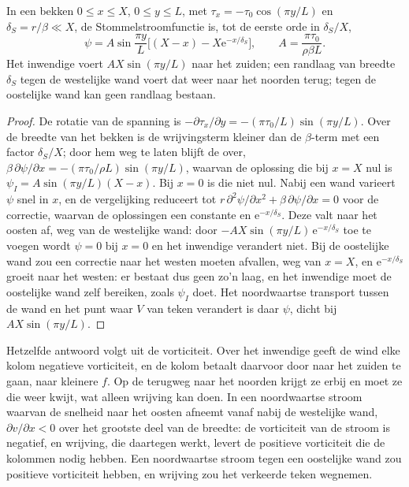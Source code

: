 \begin{theorem}\label{thm:b3:ocean-dynamics:stommel}
In een bekken $0 \le x \le X$, $0 \le y \le L$, met $\tau_x = -\tau_0
\cos(\pi y/L)$ en $\delta_S = r/\beta \ll X$, de Stommelstroomfunctie
is, tot de eerste orde in $\delta_S/X$,
\[
\psi = A\sin\frac{\pi y}{L}\Big[(X - x) - X\mathrm e^{-x/\delta_S}\Big],
\qquad A = \frac{\pi\tau_0}{\rho\beta L} .
\]
Het inwendige voert $AX\sin(\pi y/L)$ naar het zuiden; een randlaag van breedte
$\delta_S$ tegen de westelijke wand voert dat weer naar het noorden terug; tegen de oostelijke
wand kan geen randlaag bestaan.
\end{theorem}

\begin{proof}
De rotatie van de spanning is $-\partial\tau_x/\partial y = -(\pi\tau_0/L)\sin(\pi
y/L)$. Over de breedte van het bekken is de wrijvingsterm kleiner dan de
$\beta$-term met een factor $\delta_S/X$; door hem weg te laten blijft de  over,
$\beta\,\partial\psi/\partial x = -(\pi\tau_0/\rho L)\sin(\pi y/L)$, waarvan de
oplossing die bij $x = X$ nul is $\psi_I = A\sin(\pi y/L)(X - x)$. Bij
$x = 0$ is die niet nul. Nabij een wand varieert $\psi$ snel in $x$, en de
vergelijking reduceert tot $r\,\partial^2\psi/\partial x^2 + \beta\,\partial\psi/
\partial x = 0$ voor de correctie, waarvan de oplossingen een constante en
$\mathrm e^{-x/\delta_S}$. Deze valt naar het oosten af, weg van de westelijke
wand: door $-AX\sin(\pi y/L)\,\mathrm e^{-x/\delta_S}$ toe te voegen wordt $\psi = 0$
bij $x = 0$ en het inwendige verandert niet. Bij de oostelijke wand zou een
correctie naar het westen moeten afvallen, weg van $x = X$, en
$\mathrm e^{-x/\delta_S}$ groeit naar het westen: er bestaat dus geen zo'n laag, en
het inwendige moet de oostelijke wand zelf bereiken, zoals $\psi_I$ doet. Het
noordwaartse transport tussen de wand en het punt waar $V$ van teken verandert
is daar $\psi$, dicht bij $AX\sin(\pi y/L)$.
\end{proof}

Hetzelfde antwoord volgt uit de vorticiteit. Over het inwendige geeft de wind
elke kolom negatieve vorticiteit, en de kolom betaalt daarvoor door naar het zuiden te gaan,
naar kleinere $f$. Op de terugweg naar het noorden krijgt ze  erbij en moet ze die weer kwijt, wat alleen wrijving kan doen. In een noordwaartse stroom
waarvan de snelheid naar het oosten afneemt vanaf nabij de westelijke wand, $\partial
v/\partial x < 0$ over het grootste deel van de breedte: de vorticiteit van de stroom is negatief, en wrijving, die daartegen werkt,
levert de positieve vorticiteit die de kolommen nodig hebben. Een noordwaartse
stroom tegen een oostelijke wand zou positieve vorticiteit hebben, en
wrijving zou het verkeerde teken wegnemen.

